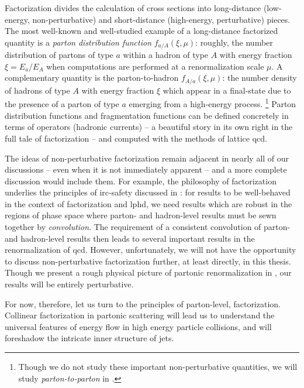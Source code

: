 Factorization divides the calculation of cross sections into long-distance (low-energy, non-perturbative) and short-distance (high-energy, perturbative) pieces.
%
The most well-known and well-studied example of a long-distance factorized quantity is a \textit{parton distribution function} \(f_{a/A}(\xi, \mu)\):
%
roughly, the number distribution of partons of type \(a\) within a hadron of type \(A\) with energy fraction \(\xi = E_a / E_A\) when computations are performed at a renormalization scale \(\mu\).
%
A complementary quantity is the \gls{parton-to-hadron} \(f_{A/a}(\xi,\mu)\):
%
the number density of hadrons of type \(A\) with energy fraction \(\xi\) which appear in a final-state due to the presence of a parton of type \(a\) emerging from a high-energy process.%
\footnote{
    Though we do not study these important non-perturbative quantities, we will study \emph{\gls{parton-to-parton}} in .
}
%
Parton distribution functions and fragmentation functions can be defined concretely in terms of operators (hadronic currents) -- a beautiful story in its own right in the full tale of factorization -- and computed with the methods of lattice \gls{qcd}.


The ideas of non-perturbative factorization remain adjacent in nearly all of our discussions -- even when it is not immediately apparent -- and a more complete discussion would include them.
%
For example, the philosophy of factorization underlies the principles of \gls{irc-safety} discussed in :
%
for results to be well-behaved in the context of factorization and \gls{lphd}, we need results which are robust in the  regions of phase space where parton- and hadron-level results must be sewn together by \textit{convolution}.
%
The requirement of a consistent convolution of parton- and hadron-level results then leads to several important results in the renormalization of \gls{qcd}.
%
However, unfortunately, we will not have the opportunity to discuss non-perturbative factorization further, at least directly, in this thesis.
%
Though we present a rough physical picture of partonic renormalization in , our results will be entirely perturbative.


For now, therefore, let us turn to the principles of parton-level,  factorization.
%
Collinear factorization in partonic scattering will lead us to understand the universal features of energy flow in high energy particle collisions, and will foreshadow the intricate inner structure of jets.



